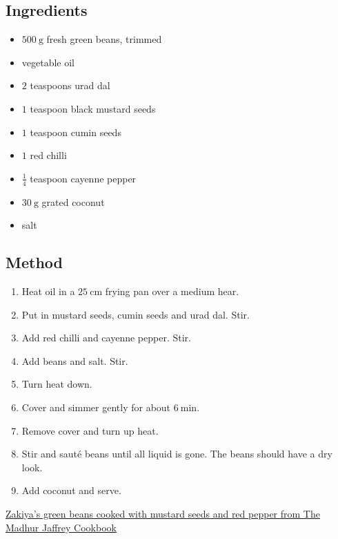 \documentclass[11pt,a4paper]{article}
\begin{document}
\subsection*{Ingredients}

\begin{itemize}
  \item $ \qty{500}{\gram} $ fresh green beans, trimmed
  \item vegetable oil
  \item $ 2 $ teaspoons urad dal
  \item $ 1 $ teaspoon black mustard seeds
  \item $ 1 $ teaspoon cumin seeds
  \item $ 1 $ red chilli
  \item $ \frac{1}{4} $ teaspoon cayenne pepper
  \item $ \qty{30}{\gram} $ grated coconut
  \item salt
\end{itemize}

\medskip

\subsection*{Method}

\begin{enumerate}
  \item Heat oil in a $ \qty{25}{\cm} $ frying pan over a medium hear.
  \item Put in mustard seeds, cumin seeds and urad dal. Stir.
  \item Add red chilli and cayenne pepper. Stir.
  \item Add beans and salt. Stir.
  \item Turn heat down.
  \item Cover and simmer gently for about $ \qty{6}{\minute} $.
  \item Remove cover and turn up heat.
  \item Stir and sauté beans until all liquid is gone. The beans should have a dry look.
  \item Add coconut and serve.
\end{enumerate}

\href{https://www.eatyourbooks.com/library/recipes/2575259/zakiyas-green-beans-cooked-with}{Zakiya's green beans cooked with mustard seeds and red pepper from The Madhur Jaffrey Cookbook}
\end{document}
